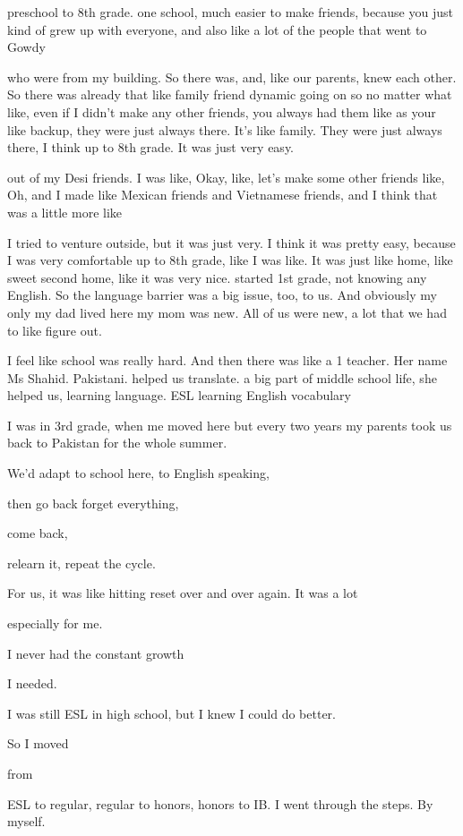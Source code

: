\begin{FoundPoem}
preschool to 8th grade.   one school,       	much easier to make friends,
because you just kind of grew up with everyone, and also like a lot of the
people that went to Gowdy 

who were from my building. So there was, and, like our parents, knew each
other. So there was already that like family friend dynamic going on so no
matter what like, even if I didn't make any other friends, you always had them
like as your like backup, they were just always there. It's like family. They were
just always there, I think up to 8th grade. It was just very easy.

out of my Desi friends. I was like, Okay, like, let's make some other friends
like, Oh, and I made like Mexican friends and Vietnamese friends, and I think
that was a little more like

I tried to venture outside, but it was just very. I think it was pretty easy,
because I was very comfortable up to 8th grade, like I was like. It was just like
home, like sweet second home, like it was very nice.
started 1st grade, not knowing any English.
 So the language barrier was a big issue, too, to us. And obviously my only my
 dad lived here 
 my mom was new. 
 All of us were new, 
 a lot that we had to like figure out.

I feel like school was really hard. 
And then there was like a 1 teacher.
 Her name      Ms Shahid.       	Pakistani. 
 helped us	 translate.
a big part of       middle school life,       she helped us,    learning                  language. 
 ESL   
 learning English vocabulary

I was in 3rd grade, when me moved here
but every two years 
my parents took us back to Pakistan 
for the whole summer.  	

We’d adapt to school here,  			to English speaking, 

then go back    forget everything, 

come back, 

relearn it, 
          repeat the cycle.  
          
For us, 
         it was like hitting reset 
over and over again. 
It was a lot  

especially for me. 

I never had the constant growth 

I needed. 

I was still ESL in high school, 
but I knew I could do better. 

So I moved 

from

ESL to regular, 
regular to honors, 
honors to IB. 
I went through the steps. 
By myself.
\end{FoundPoem}

